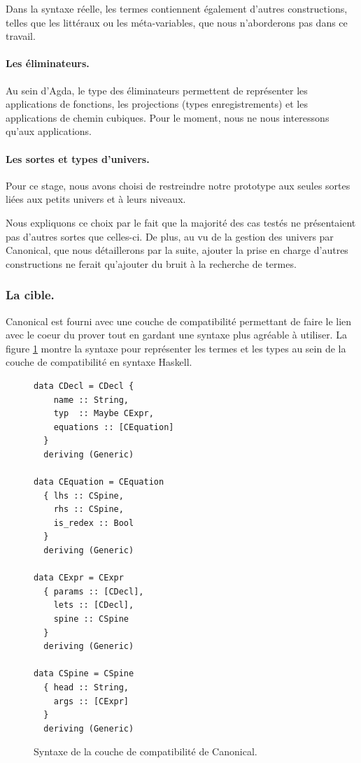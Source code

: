\documentclass[11pt]{article}
\begin{document}
Dans la syntaxe réelle, les termes contiennent également d’autres constructions, 
telles que les littéraux ou les méta-variables, que nous n’aborderons pas dans ce travail.

\paragraph{Les éliminateurs.}
Au sein d'Agda, le type des éliminateurs permettent de représenter les applications de fonctions, 
les projections (types enregistrements) et les applications de chemin cubiques.
Pour le moment, nous ne nous interessons qu'aux applications.


\paragraph{Les sortes et types d'univers.}
Pour ce stage, nous avons choisi de restreindre notre prototype aux seules sortes liées aux petits univers et à leurs niveaux.

Nous expliquons ce choix par le fait que la majorité des cas testés ne présentaient pas d’autres sortes que celles-ci. 
De plus, au vu de la gestion des univers par Canonical, que nous détaillerons par la suite, 
ajouter la prise en charge d’autres constructions ne ferait qu’ajouter du bruit à la recherche de termes.



\subsubsection{La cible.}
Canonical est fourni avec une couche de compatibilité permettant de faire le lien avec le coeur du prover tout en gardant une syntaxe plus agréable à utiliser.
La figure \ref{fig:can-comp} montre la syntaxe pour représenter les termes et les types au sein de la couche de compatibilité en syntaxe Haskell.

\begin{figure}[h]
\centering
\begin{verbatim}
data CDecl = CDecl {
    name :: String, 
    typ  :: Maybe CExpr,
    equations :: [CEquation]
  }
  deriving (Generic)

data CEquation = CEquation
  { lhs :: CSpine,
    rhs :: CSpine,
    is_redex :: Bool
  }
  deriving (Generic)

data CExpr = CExpr
  { params :: [CDecl],
    lets :: [CDecl],
    spine :: CSpine
  }
  deriving (Generic)

data CSpine = CSpine
  { head :: String,
    args :: [CExpr]
  }
  deriving (Generic)

\end{verbatim}
\caption{Syntaxe de la couche de compatibilité de Canonical.}
\label{fig:can-comp}
\end{figure}
\end{document}
